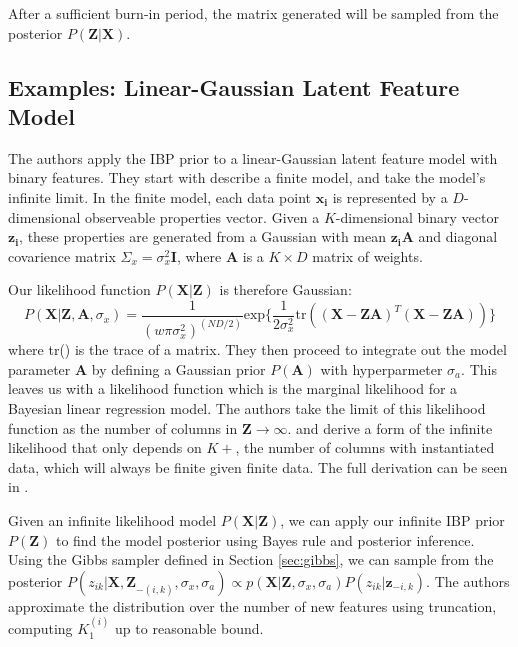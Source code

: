 \documentclass[twoside]{article}
\begin{document}
After a sufficient burn-in period, the matrix generated will be sampled from the posterior $P(\mathbf{Z|X})$.

\subsection{Examples: Linear-Gaussian Latent Feature Model}
The authors apply the IBP prior to a linear-Gaussian latent feature model with binary features. They start with describe a finite model, and take the model's infinite limit. In the finite model, each data point $\mathbf{x_i}$ is represented by a $D$-dimensional observeable properties vector. Given a $K$-dimensional binary vector $\mathbf{z_i}$, these properties are generated from a Gaussian with mean $\mathbf{z_iA}$ and diagonal covarience matrix $\Sigma_x = \sigma_x^2\mathbf{I}$, where $\mathbf{A}$ is a $K \times D$ matrix of weights.

Our likelihood function $P(\mathbf{X|Z})$ is therefore Gaussian:
\begin{equation}
    P(\mathbf{X|Z, A}, \sigma_x) = \frac{1}{(w\pi\sigma_x^2)^{(ND/2)}}\text{exp}\{\frac{1}{2\sigma_x^2} \text{tr}((\mathbf{X-ZA})^T(\mathbf{X-ZA}))\}
\end{equation}
where tr() is the trace of a matrix. They then proceed to integrate out the model parameter $\mathbf{A}$ by defining a Gaussian prior $P(\mathbf{A})$ with hyperparmeter $\sigma_a$. This leaves us with a likelihood function which is the marginal likelihood for a Bayesian linear regression model. The authors take the limit of this likelihood function as the number of columns in $\mathbf{Z} \to \infty$. and derive a form of the infinite likelihood that only depends on $K+$, the number of columns with instantiated data, which will always be finite given finite data. The full derivation can be seen in \citet{Griffiths2011}.

Given an infinite likelihood model $P(\mathbf{X|Z})$, we can apply our infinite IBP prior $P(\mathbf{Z})$ to find the model posterior using Bayes rule and posterior inference. Using the Gibbs sampler defined in Section \ref{sec:gibbs}, we can sample from the posterior $P(z_{ik}|
\mathbf{X, Z}_{-(i,k)}, \sigma_x, \sigma_a) \propto p(\mathbf{X|Z}, \sigma_x, \sigma_a)P(z_{ik}|\mathbf{z}_{-i, k})$. The authors approximate the distribution over the number of new features using truncation, computing $K_1^{(i)}$ up to reasonable bound.
\end{document}
